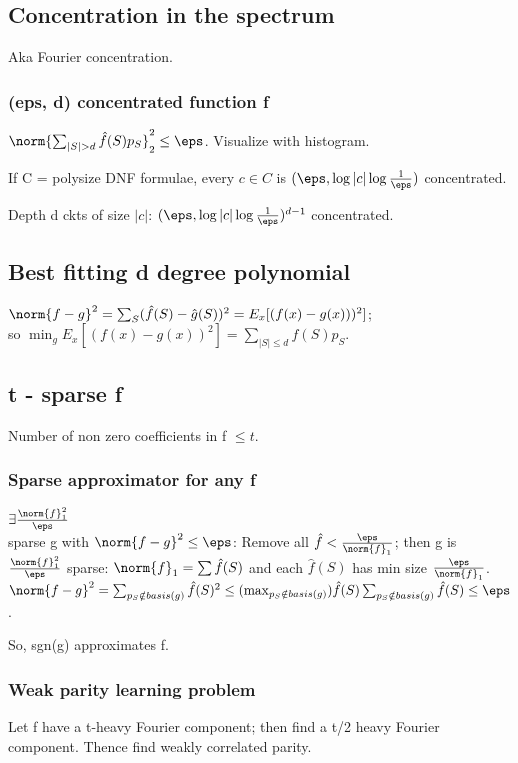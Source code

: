 \documentclass[oneside, article]{memoir}
\begin{document}
\subsection{Concentration in the spectrum}
Aka Fourier concentration.

\subsubsection{(eps, d) concentrated function f}
$\norm{\sum_{|S| >d} \hat{f}(S)p_{S}}_{2}^{2} \leq \eps$. Visualize with histogram.

If C = polysize DNF formulae, every $c\in C$ is $(\eps, \log |c| \log\frac{1}{\eps})$ concentrated. \why

Depth d ckts of size $|c|$: $(\eps,\log |c| \log\frac{1}{\eps})^{d-1}$ concentrated. \why

\subsection{Best fitting d degree polynomial}
$\norm{f-g}^{2} = \sum_{S} (\hat{f}(S)-\hat{g}(S))^{2} = E_{x}[(f(x)-g(x)))^{2}]$; \\
so $\min_{g} E_{x}[(f(x)-g(x))^{2}] = \sum_{|S|\leq d} \hat{f}(S)p_{S}$.

\subsection{t - sparse f}
Number of non zero coefficients in f $\leq t$.

\subsubsection{Sparse approximator for any f}
$\exists \frac{\norm{f}_{1}^{2}}{\eps}$ \\
sparse g with $\norm{f-g}^{2} \leq \eps$: Remove all $\hat{f}< \frac{\eps}{\norm{f}_{1}}$; then g is $\frac{\norm{f}_{1}^{2}}{\eps}$ sparse: $\norm{f}_{1} = \sum \hat{f}(S)$ and each $\hat{f}(S)$ has min size $\frac{\eps}{\norm{f}_{1}}$. $\norm{f-g}^{2} = \sum_{p_{S} \notin basis(g)} \hat{f}(S)^{2} \leq \\
(\max_{p_{S} \notin basis(g)}) \hat{f}(S) \sum_{p_{S} \notin basis(g)} \hat{f}(S) \leq \eps$.

So, sgn(g) approximates f.

\subsubsection{Weak parity learning problem}
Let f have a t-heavy Fourier component; then find a t/2 heavy Fourier component. Thence find weakly correlated parity.
\end{document}
